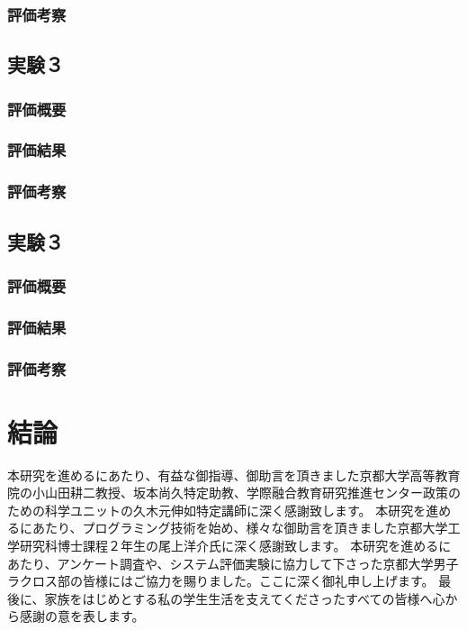 \documentclass[sotsuron]{kuee}
\begin{document}
\subsection{評価考察}
\section{実験３}
\subsection{評価概要}
\subsection{評価結果}
\subsection{評価考察}
\section{実験３}
\subsection{評価概要}
\subsection{評価結果}
\subsection{評価考察}

\chapter{結論}


\begin{acknowledgements}
 本研究を進めるにあたり、有益な御指導、御助言を頂きました京都大学高等教育院の小山田耕二教授、坂本尚久特定助教、学際融合教育研究推進センター政策のための科学ユニットの久木元伸如特定講師に深く感謝致します。
本研究を進めるにあたり、プログラミング技術を始め、様々な御助言を頂きました京都大学工学研究科博士課程２年生の尾上洋介氏に深く感謝致します。
本研究を進めるにあたり、アンケート調査や、システム評価実験に協力して下さった京都大学男子ラクロス部の皆様にはご協力を賜りました。ここに深く御礼申し上げます。
最後に、家族をはじめとする私の学生生活を支えてくださったすべての皆様へ心から感謝の意を表します。
\end{acknowledgements}








\appendix
\end{document}
